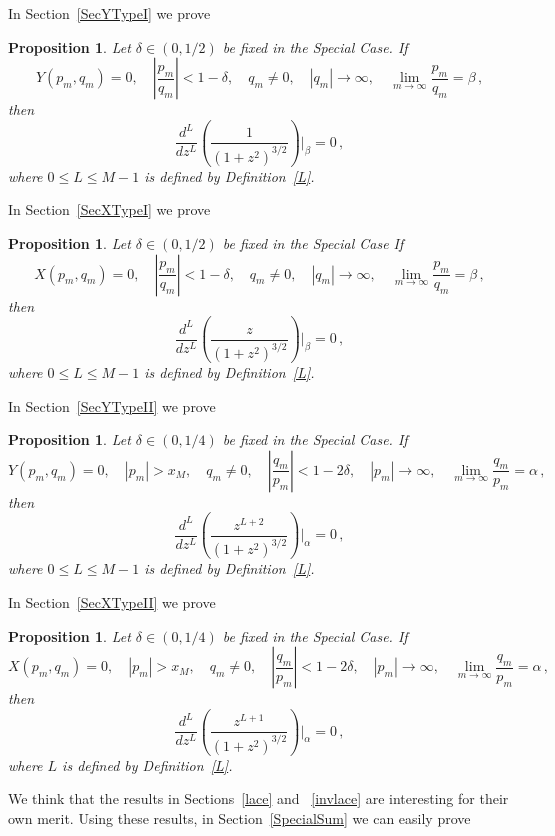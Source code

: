 \documentclass{article}
\newtheorem{prop}[thm]{Proposition}
\theoremstyle{remark}
\numberwithin{equation}{section}
\begin{document}
In Section~\ref{SecYTypeI} we prove 

\begin{prop}\label{YTypeI} Let $\delta \in (0,1/2)$ be fixed in the Special Case. If
$$Y(p_m,q_m) = 0, \quad \left| \frac{p_m}{q_m} \right| < 1-\delta, \quad q_m \neq 0, \quad |q_m| \rightarrow \infty, \quad \lim_{m \rightarrow \infty}{\frac{p_m}{q_m}} = \beta\,,$$
then
$$\frac{d^L}{d z^L} \left( \frac{1}{(1+z^2)^{3/2}} \right)\bigg |_\beta = 0\,,$$
where $0 \leq L \leq M-1$ is defined by Definition~\ref{L}.
\end{prop}

In Section~\ref{SecXTypeI} we prove

\begin{prop}\label{XTypeI} Let $\delta \in (0,1/2)$ be fixed in the Special Case If
$$X(p_m,q_m) = 0, \quad \left| \frac{p_m}{q_m} \right| < 1-\delta, \quad q_m \neq 0, \quad |q_m| \rightarrow \infty, \quad \lim_{m \rightarrow \infty}{\frac{p_m}{q_m}} = \beta\,,$$
then
$$\frac{d^L}{d z^L} \left( \frac{z}{(1+z^2)^{3/2}} \right) \bigg |_\beta= 0\,,$$
where $0 \leq L \leq M-1$ is defined by Definition~\ref{L}.
\end{prop}

In Section~\ref{SecYTypeII} we prove

\begin{prop}\label{YTypeII}  Let $\delta \in (0,1/4)$ be fixed in the Special Case. If
$$Y(p_m,q_m) = 0, \quad |p_m| > x_M, \quad q_m \neq 0, \quad \left| \frac{q_m}{p_m} \right| < 1-2\delta, \quad |p_m| \rightarrow \infty, \quad 
\lim_{m \rightarrow \infty}{\frac{q_m}{p_m}} = \alpha\,,$$
then
$$\frac{d^L}{dz^L} \left( \frac{z^{L+2}}{(1+z^2)^{3/2}} \right)\bigg|_\alpha = 0\,,$$
where $0 \leq L \leq M-1$ is defined by Definition~\ref{L}.
\end{prop}

In Section~\ref{SecXTypeII} we prove

\begin{prop}\label{XTypeII} Let $\delta \in (0,1/4)$ be fixed in the Special Case. If
$$X(p_m,q_m) = 0, \quad |p_m| > x_M, \quad q_m \neq 0, \quad \left| \frac{q_m}{p_m} \right| < 1-2\delta, \quad |p_m| \rightarrow \infty, \quad \lim_{m \rightarrow \infty}{\frac{q_m}{p_m}} = \alpha\,,$$
then 
$$\frac{d^L}{dz^L} \left( \frac{z^{L+1}}{(1+z^2)^{3/2}} \right)\bigg |_\alpha = 0\,,$$
where $L$ is defined by Definition~\ref{L}.
\end{prop}

We think that the results in Sections~\ref{lace} and ~\ref{invlace} are interesting for their own merit. 
Using these results, in Section~\ref{SpecialSum} we can easily prove 
\end{document}

